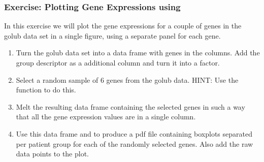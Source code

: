 \documentclass{article}\usepackage[]{graphicx}\usepackage[usenames,dvipsnames]{color}
\begin{document}
\subsubsection*{Exercise: Plotting Gene Expressions using }
In this exercise we will plot the gene expressions for a couple
of genes in the golub data set in a single figure, using a separate 
panel for each gene.

\begin{enumerate}[label=(\emph{\alph*})]
\item Turn the golub data set into a 
data frame with genes in the columns. Add the
group descriptor  as a additional
column and turn it into a factor.

\item Select a random sample of 6 genes from the golub
data. HINT: Use the function  to do this.

\item Melt the resulting data frame containing the selected genes
in such a way that all the gene expression values are in 
a single column.

\item Use this data frame and  to produce
a pdf file containing boxplots separated per patient group for each
of the randomly selected genes. Also add the raw data points 
to the plot.
\end{enumerate}
\end{document}
